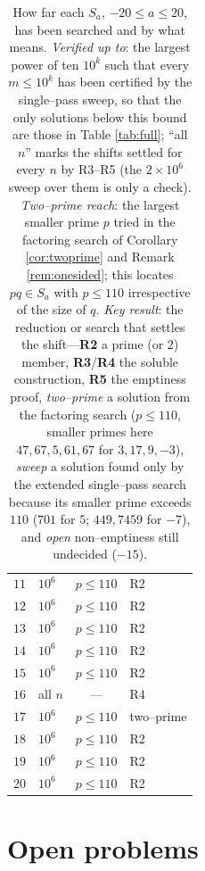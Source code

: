 \documentclass[11pt,reqno]{amsart}
\theoremstyle{plain}
\theoremstyle{definition}
\theoremstyle{remark}
\newcommand{\Sa}{S_a}
\begin{document}
\begin{table}[H]
\begin{tabular}{r l c l}
$11$ & $10^{6}$ & $p\le110$ & R2 \\
$12$ & $10^{6}$ & $p\le110$ & R2 \\
$13$ & $10^{6}$ & $p\le110$ & R2 \\
$14$ & $10^{6}$ & $p\le110$ & R2 \\
$15$ & $10^{6}$ & $p\le110$ & R2 \\
$16$ & all $n$ & --- & R4 \\
$17$ & $10^{6}$ & $p\le110$ & two--prime \\
$18$ & $10^{6}$ & $p\le110$ & R2 \\
$19$ & $10^{6}$ & $p\le110$ & R2 \\
$20$ & $10^{6}$ & $p\le110$ & R2 \\
\bottomrule
\end{tabular}
\caption{How far each $S_a$, $-20\le a\le20$, has been searched and by what means. \emph{Verified up to}: the largest power of ten $10^{k}$ such that every $m\le10^{k}$ has been certified by the single--pass sweep, so that the only solutions below this bound are those in Table \ref{tab:full}; ``all $n$'' marks the shifts settled for every $n$ by R3--R5 (the $2\times10^{6}$ sweep over them is only a check). \emph{Two--prime reach}: the largest smaller prime $p$ tried in the factoring search of Corollary \ref{cor:twoprime} and Remark \ref{rem:onesided}; this locates $pq\in\Sa$ with $p\le110$ irrespective of the size of $q$. \emph{Key result}: the reduction or search that settles the shift---\textbf{R2} a prime (or $2$) member, \textbf{R3}/\textbf{R4} the soluble construction, \textbf{R5} the emptiness proof, \emph{two--prime} a solution from the factoring search ($p\le110$, smaller primes here $47,67,5,61,67$ for $3,17,9,-3$), \emph{sweep} a solution found only by the extended single--pass search because its smaller prime exceeds $110$ ($701$ for $5$; $449,7459$ for $-7$), and \emph{open} non--emptiness still undecided ($-15$).}
\label{tab:verified}
\end{table}

\section{Open problems}\label{sec:open}
\end{document}
